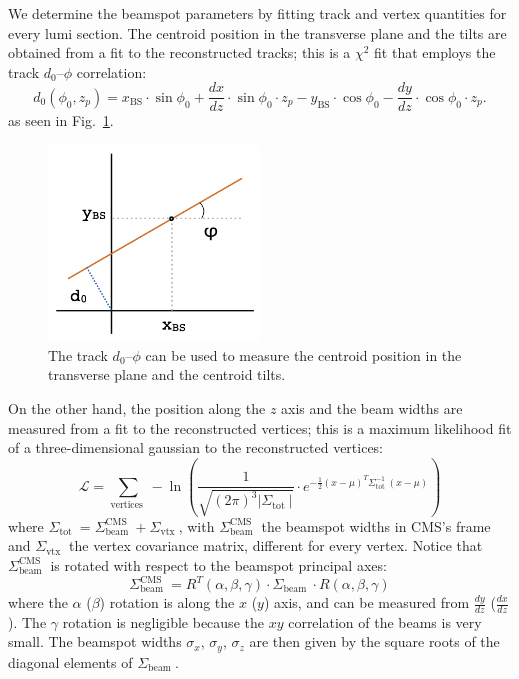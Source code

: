 We determine the beamspot parameters by fitting track and vertex quantities for every lumi section.
The centroid position in the transverse plane and the tilts are obtained from a fit to the reconstructed tracks;
this is a $\chi^2$ fit that employs the track $d_0$--$\phi$ correlation:
\[
d_0(\phi_0, z_p) = x_{\text{BS}} \cdot \sin \phi_0 + \frac{dx}{dz} \cdot \sin\phi_0 \cdot z_p - y_{\text{BS}} \cdot \cos \phi_0 - \frac{dy}{dz} \cdot \cos \phi_0 \cdot z_p.
\]
as seen in Fig.~\ref{fig:trackD0Correlation}.

\begin{figure}[htbp]
   \centering
   \includegraphics[width=0.5\textwidth]{figures/trackD0PhiCorrelation.png}
   \caption{The track $d_0$--$\phi$ can be used to measure the centroid position in the transverse plane and the centroid tilts.}
   \label{fig:trackD0Correlation}
\end{figure}

On the other hand,
the position along the $z$ axis and the beam widths are measured from a fit to the reconstructed vertices;
this is a maximum likelihood fit of a three-dimensional gaussian to the reconstructed vertices:
\[
\mathcal{L}=\sum_{\text {vertices }}-\ln \left(\frac{1}{\sqrt{(2 \pi)^3\left|\Sigma_{\text {tot }}\right|}} \cdot e^{-\frac{1}{2}(x-\mu)^T \Sigma_{\text {tot }}^{-1}(x-\mu)}\right)
\]
where $\Sigma_{\text {tot }} = \Sigma_{\text {beam }}^{\text {CMS }} + \Sigma_{\text {vtx }}$, with
$\Sigma_{\text {beam }}^{\text {CMS }}$ the beamspot widths in CMS's frame and
$\Sigma_{\text {vtx }}$ the vertex covariance matrix, different for every vertex.
Notice that $\Sigma_{\text {beam }}^{\text {CMS }}$ is rotated with respect to the beamspot principal axes:
\[
\Sigma_{\text {beam }}^{\text {CMS }}=R^T(\alpha, \beta, \gamma) \cdot \Sigma_{\text {beam }} \cdot R(\alpha, \beta, \gamma)
\]
where the $\alpha$ ($\beta$) rotation is along the $x$ ($y$) axis, and can be measured from $\frac{dy}{dz}$ ($\frac{dx}{dz}$).
The $\gamma$ rotation is negligible because the $xy$ correlation of the beams is very small.
The beamspot widths $\sigma_x$, $\sigma_y$, $\sigma_z$ are then given by the square roots of the diagonal elements of $\Sigma_{\text {beam }}$.

